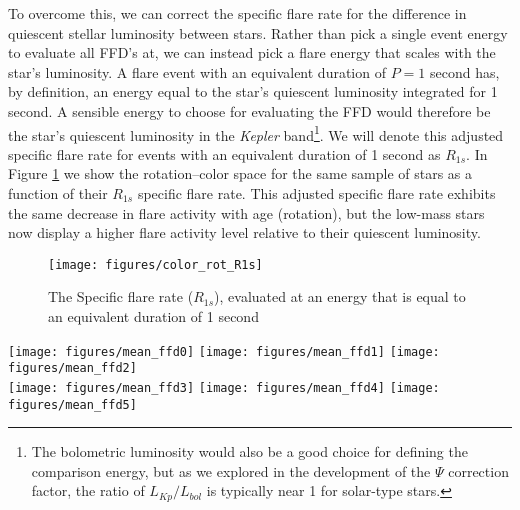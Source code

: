 \documentclass[preprint2]{aastex62}
\newcommand{\Kepler}{\textsl{Kepler}\xspace}
\begin{document}
To overcome this, we can correct the specific flare rate for the difference in quiescent stellar luminosity between stars. Rather than pick a single event energy to evaluate all FFD's at, we can instead pick a flare energy that scales with the star's luminosity. A flare event with an equivalent duration of $P=1$ second has, by definition, an energy equal to the star's quiescent luminosity integrated for 1 second. A sensible energy to choose for evaluating the FFD would therefore be the star's quiescent luminosity in the \Kepler band\footnote{The bolometric luminosity would also be a good choice for defining the comparison energy, but as we explored in the development of the $\Psi$ correction factor, the ratio of $L_{Kp}/L_{bol}$ is typically near 1 for solar-type stars.}. We will denote this adjusted specific flare rate for events with an equivalent duration of 1 second as $R_{1s}$. In Figure \ref{fig:R1s} we show the rotation--color space for the same sample of stars as a function of their $R_{1s}$ specific flare rate. This adjusted specific flare rate exhibits the same decrease in flare activity with age (rotation), but the low-mass stars now display a higher flare activity level relative to their quiescent luminosity.

\begin{figure}[!ht]
\centering
\texttt{[image: figures/color\_rot\_R1s]}
\caption{
The Specific flare rate ($R_{1s}$), evaluated at an energy that is equal to an equivalent duration of 1 second
}
\label{fig:R1s}
\end{figure}










\begin{figure*}[!ht]
\centering
\texttt{[image: figures/mean\_ffd0]}
\texttt{[image: figures/mean\_ffd1]}
\texttt{[image: figures/mean\_ffd2]}\\
\texttt{[image: figures/mean\_ffd3]}
\texttt{[image: figures/mean\_ffd4]}
\texttt{[image: figures/mean\_ffd5]}
\caption{
Average FFD, combining all available quarters of \Kepler data, for stars in the 6 $g-i$ color bins defined in \citet{davenport2016}. Each track is colored as a function of the measured rotation period from \citet{mcquillan2014}. A clear and coherent decrease in the total flare rates is observed as stars slow down (age) within each panel.
}
\label{fig:meanffd}
\end{figure*}
\end{document}
